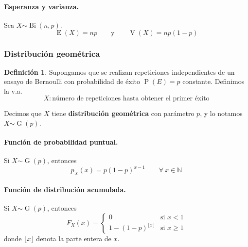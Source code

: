 \documentclass[11pt]{article}
\theoremstyle{plain}
\theoremstyle{definition}
\newtheorem*{defi}{Definición}
\theoremstyle{remark}
\newcommand{\deft}[1]{\textbf{#1}}  %
\newcommand{\proba}{\ensuremath{\operatorname{P}}}  %
\newcommand{\esp}[0]{\ensuremath{\operatorname{E}}}  %
\newcommand{\var}[0]{\ensuremath{\operatorname{V}}}  %
\newcommand{\foralle}{\ensuremath{\forall \ }}  %
\newcommand{\dist}[1]{\ensuremath{\sim \operatorname{#1}}}  %
\begin{document}
      \paragraph{Esperanza y varianza.}
      Sea $X \dist{Bi}(n,p)$.
      \[ \esp(X) = np \qquad \text{y} \qquad \var(X) = np(1 - p) \]

    \subsubsection{Distribución geométrica}

      \begin{defi}
        Supongamos que se realizan repeticiones independientes de un ensayo de Bernoulli con probabilidad de éxito $\proba(E) = p$ constante. Definimos la v.a.
        \[ X : \text{número de repeticiones hasta obtener el primer éxito} \]

        Decimos que $X$ tiene \deft{distribución geométrica} con parámetro $p$, y lo notamos $X \dist{G}(p)$.
      \end{defi}

      \paragraph{Función de probabilidad puntual.}
      Si $X \dist{G}(p)$, entonces
      \[ p_X(x) = p(1 - p)^{x - 1} \qquad \foralle x \in \mathbb{N} \]

      \paragraph{Función de distribución acumulada.}
      Si $X \dist{G}(p)$, entonces
      \[ F_X(x) = \begin{cases}
        0 & \text{si $x < 1$} \\
        \displaystyle 1 - (1 - p)^{\lfloor x \rfloor} & \text{si $x \geq 1$}
      \end{cases}  \]
      donde $\lfloor x \rfloor$ denota la parte entera de $x$.
\end{document}

